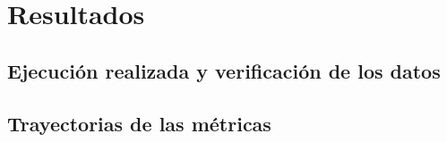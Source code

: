 %

\section{Resultados}

\subsection{Ejecución realizada y verificación de los datos}

\subsection{Trayectorias de las métricas}
%   
%   
%   
%   
%   

